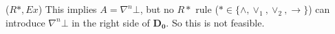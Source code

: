 ($R*, Ex$) This implies $A = \nabla^n \bot$, but no $R*$ rule ($* \in \{ \land , \lor_1, \lor_2, \rightarrow \}$) can introduce $\nabla^n \bot$ in the right side of $\mathbf{D_0}$. So this is not feasible.